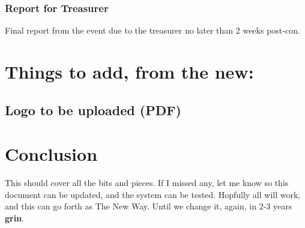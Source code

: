 \documentclass[captions=tablesignature]{scrartcl}
\begin{document}
\subsubsection{Report for Treasurer}
\label{sec-3-2-26}
Final report from the event due to the treasurer no later than 2
weeks post-con.

\section{Things to add, from the new:}
\label{sec-4}
\subsection{Logo to be uploaded (PDF)}
\label{sec-4-1}

\section{Conclusion}
\label{sec-5}
This should cover all the bits and pieces.  If I missed any, let me
know so this document can be updated, and the system can be tested.
Hopfully all will work, and this can go forth as The New Way.  Until
we change it, again, in 2-3 years \textbf{grin}.
\end{document}
